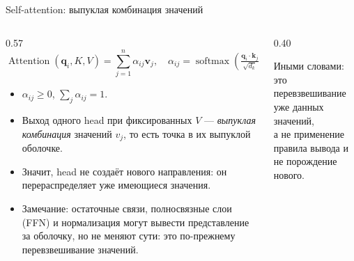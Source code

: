 \documentclass[aspectratio=169,11pt]{beamer}
\begin{document}
\begin{frame}[shrink=2]{Self-attention: выпуклая комбинация значений}
  \small
  \begin{columns}[T,onlytextwidth]
    \begin{column}{0.57\textwidth}
      \begin{equation*}
        \operatorname{Attention}(\mathbf q_i,K,V)
        =\sum_{j=1}^{n}\alpha_{ij}\mathbf v_j,
        \quad
        \alpha_{ij}=\operatorname{softmax}\!\left(\tfrac{\mathbf q_i\cdot\mathbf k_j}{\sqrt{d_k}}\right)
      \end{equation*}
      \begin{itemize}
        \item \(\alpha_{ij}\ge 0\), \(\sum_j \alpha_{ij}=1\).
        \item Выход одного head при фиксированных \(V\) --- \emph{выпуклая
              комбинация} значений \(v_j\), то есть точка в их выпуклой
              оболочке.
        \item Значит, head не создаёт нового направления: он перераспределяет
              уже имеющиеся значения.
        \item Замечание: остаточные связи, полносвязные слои (FFN) и
              нормализация могут вывести представление за оболочку, но не
              меняют сути: это по-прежнему перевзвешивание значений.
      \end{itemize}
    \end{column}
    \begin{column}{0.40\textwidth}
      \centering

      \smallskip
      {\footnotesize Иными словами: это перевзвешивание уже данных значений,\\
      а не применение правила вывода и не порождение нового.}
    \end{column}
  \end{columns}
\end{frame}
\end{document}
